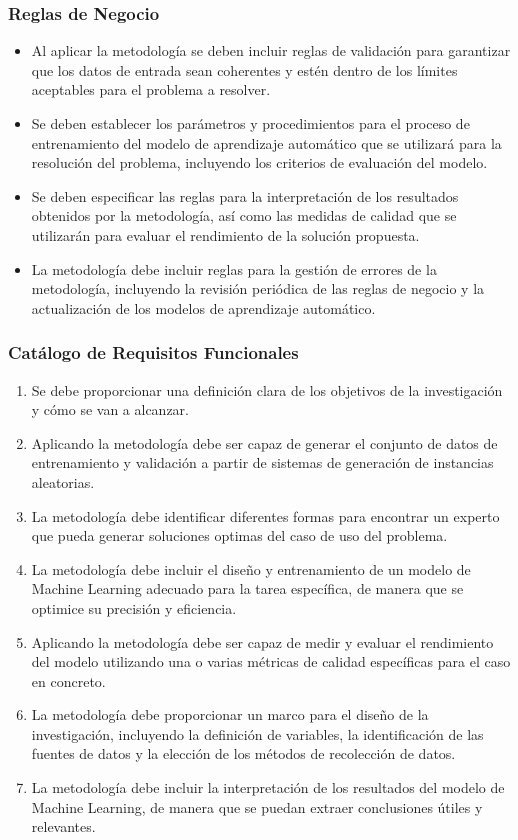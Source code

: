 \subsubsection{Reglas de Negocio}
\begin{itemize}
    \item Al aplicar la metodología se deben incluir reglas 
    de validación para garantizar que los datos de entrada sean coherentes 
    y estén dentro de los límites aceptables para el problema a resolver.
    \item Se deben establecer los parámetros y procedimientos para el proceso 
    de entrenamiento del modelo de aprendizaje automático que se utilizará 
    para la resolución del problema, incluyendo los criterios de evaluación del modelo.
    \item Se deben especificar las reglas para la interpretación de los resultados 
    obtenidos por la metodología, así como las medidas de calidad que se utilizarán 
    para evaluar el rendimiento de la solución propuesta.
    \item La metodología debe incluir reglas para la gestión de errores
    de la metodología, incluyendo la revisión periódica de las reglas de negocio 
    y la actualización de los modelos de aprendizaje automático.
\end{itemize}
\subsubsection{Catálogo de Requisitos Funcionales}
\begin{enumerate}
    \renewcommand{\labelenumi}{RF\arabic{enumi}}
    \item Se debe proporcionar una definición clara de los objetivos de la investigación 
    y cómo se van a alcanzar.
    \item Aplicando la metodología debe ser capaz de generar el conjunto de datos de entrenamiento
    y validación a partir de sistemas de generación de instancias aleatorias.
    \item La metodología debe identificar diferentes formas para encontrar un experto
    que pueda generar soluciones optimas del caso de uso del problema.
    \item La metodología debe incluir el diseño y entrenamiento de un modelo de Machine Learning 
    adecuado para la tarea específica, de manera que se optimice su precisión y eficiencia.
    \item Aplicando la metodología debe ser capaz de medir y evaluar el rendimiento del modelo 
    utilizando una o varias métricas de calidad específicas para el caso en concreto.
    \item La metodología debe proporcionar un marco para el diseño de la investigación, 
    incluyendo la definición de variables, la identificación de las fuentes de datos y 
    la elección de los métodos de recolección de datos.
    \item La metodología debe incluir la interpretación de los resultados del modelo 
    de Machine Learning, de manera que se puedan extraer conclusiones útiles y relevantes.
\end{enumerate}

